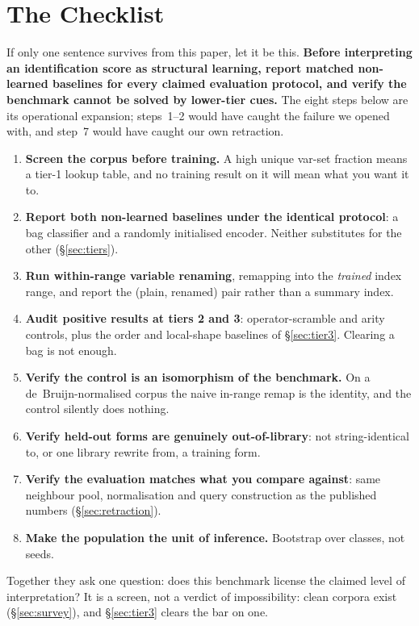 \section{The Checklist}
\label{sec:checklist}

If only one sentence survives from this paper, let it be this. \textbf{Before interpreting an
identification score as structural learning, report matched non-learned baselines for every claimed
evaluation protocol, and verify the benchmark cannot be solved by lower-tier cues.} The eight steps
below are its operational expansion; steps~1--2 would have caught the failure we opened with, and
step~7 would have caught our own retraction.

\begin{enumerate}[topsep=2pt,itemsep=0pt,leftmargin=1.5em]
  \item \textbf{Screen the corpus before training.} A high unique var-set fraction means a tier-1
    lookup table, and no training result on it will mean what you want it to.
  \item \textbf{Report both non-learned baselines under the identical protocol}: a bag classifier
    and a randomly initialised encoder. Neither substitutes for the other (\S\ref{sec:tiers}).
  \item \textbf{Run within-range variable renaming}, remapping into the \emph{trained} index range,
    and report the (plain, renamed) pair rather than a summary index.
  \item \textbf{Audit positive results at tiers 2 and 3}: operator-scramble and arity controls,
    plus the order and local-shape baselines of \S\ref{sec:tier3}. Clearing a bag is not enough.
  \item \textbf{Verify the control is an isomorphism of the benchmark.} On a de~Bruijn-normalised
    corpus the naive in-range remap is the identity, and the control silently does nothing.
  \item \textbf{Verify held-out forms are genuinely out-of-library}: not string-identical to, or
    one library rewrite from, a training form.
  \item \textbf{Verify the evaluation matches what you compare against}: same neighbour pool,
    normalisation and query construction as the published numbers (\S\ref{sec:retraction}).
  \item \textbf{Make the population the unit of inference.} Bootstrap over classes, not seeds.
\end{enumerate}

Together they ask one question: does this benchmark license the claimed level of interpretation? It
is a screen, not a verdict of impossibility: clean corpora exist (\S\ref{sec:survey}), and
\S\ref{sec:tier3} clears the bar on one.


